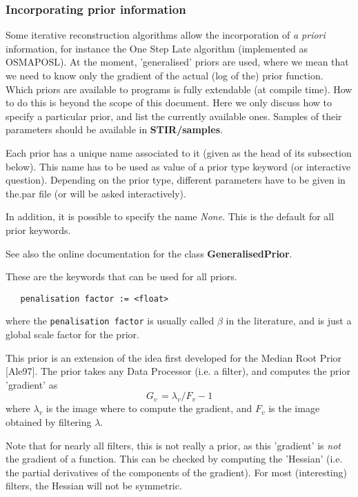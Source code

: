 \documentclass{article}
\begin{document}
\subsubsection{
Incorporating prior information}
\label{sec:priors}
Some iterative reconstruction algorithms allow the incorporation 
of \textit{a priori} information, for instance the One Step Late algorithm 
(implemented as OSMAPOSL). At the moment, 'generalised' priors 
are used, where we mean that we need to know only the gradient 
of the actual (log of the) prior function.\\
Which priors are available to programs is fully extendable (at 
compile time). How to do this is beyond the scope of this document. 
Here we only discuss how to specify a particular prior, and list 
the currently available ones. Samples of their parameters should 
be available in \textbf{STIR/samples}.



Each prior has a unique name associated to it (given as the head 
of its subsection below). This name has to be used as value of 
a prior type keyword (or interactive question). Depending on 
the prior type, different parameters have to be given in the.par 
file (or will be asked interactively).


In addition, it is possible to specify the name \textit{None}. This 
is the default for all prior keywords.


See also the online documentation for the class \textbf{GeneralisedPrior}.


{ 
}

These are the keywords that can be used for all priors.
  \begin{verbatim}
   penalisation factor := <float>
  \end{verbatim}
  \noindent where the \texttt{penalisation factor} is usually called
  $\beta$ in the literature, and is just a global scale factor for the
  prior.

{ 
}

This prior is an extension of the idea first developed for the 
Median Root Prior [Ale97]. The prior takes any Data Processor 
(i.e. a filter), and computes the prior 'gradient' as 
\[
G_{v\,} =\lambda _{v} /F_{v}  -1
\]
\noindent where 
$\lambda _{v} $
 is the image where to compute the gradient, and 
$F_{v} $ is the image obtained by filtering $\lambda $.

Note that for nearly all filters, this is not really a prior, as 
this 'gradient' is \textit{not} the gradient of a function. This can 
be checked by computing the 'Hessian' (i.e. the partial derivatives 
of the components of the gradient). For most (interesting) filters, 
the Hessian will not be symmetric.
\end{document}
